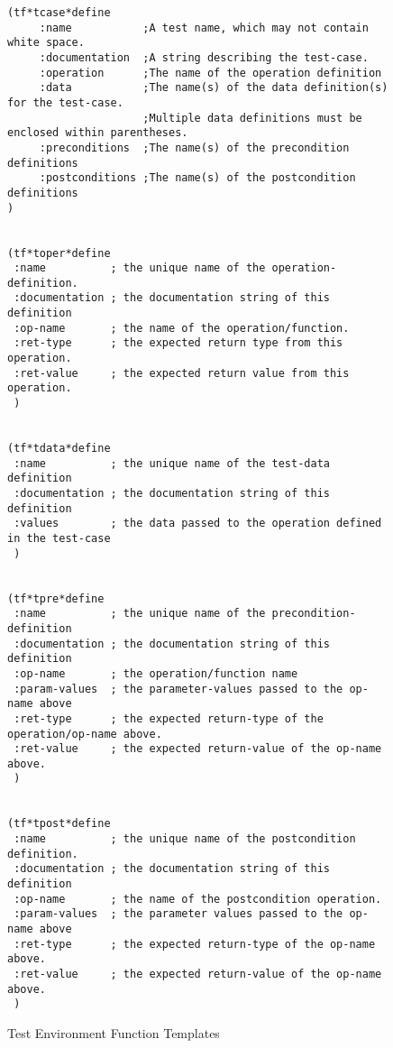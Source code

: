 \begin{figure*}
\figureline
\small\begin{verbatim}
(tf*tcase*define
     :name           ;A test name, which may not contain white space.
     :documentation  ;A string describing the test-case.
     :operation      ;The name of the operation definition 
     :data           ;The name(s) of the data definition(s) for the test-case.
                     ;Multiple data definitions must be enclosed within parentheses.
     :preconditions  ;The name(s) of the precondition definitions 
     :postconditions ;The name(s) of the postcondition definitions
)       


(tf*toper*define
 :name          ; the unique name of the operation-definition.
 :documentation ; the documentation string of this definition
 :op-name       ; the name of the operation/function.
 :ret-type      ; the expected return type from this operation.
 :ret-value     ; the expected return value from this operation.
 )


(tf*tdata*define
 :name          ; the unique name of the test-data definition 
 :documentation ; the documentation string of this definition
 :values        ; the data passed to the operation defined in the test-case
 )


(tf*tpre*define
 :name          ; the unique name of the precondition-definition
 :documentation ; the documentation string of this definition   
 :op-name       ; the operation/function name
 :param-values  ; the parameter-values passed to the op-name above
 :ret-type      ; the expected return-type of the operation/op-name above.
 :ret-value     ; the expected return-value of the op-name above.
 )


(tf*tpost*define
 :name          ; the unique name of the postcondition definition.
 :documentation ; the documentation string of this definition
 :op-name       ; the name of the postcondition operation.
 :param-values  ; the parameter values passed to the op-name above
 :ret-type      ; the expected return-type of the op-name above.
 :ret-value     ; the expected return-value of the op-name above.
 )
\end{verbatim}\normalsize
\figureline
\caption{Test Environment Function Templates}
\label{test-defs}
\end{figure*}


